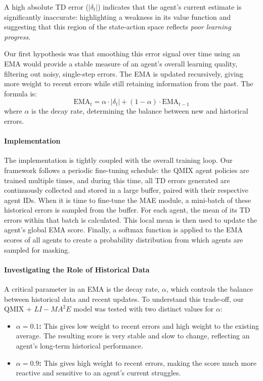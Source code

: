 A high absolute TD error ($|\delta_t|$) indicates that the agent's current estimate is significantly inaccurate: highlighting a weakness in its value function and suggesting that this region of the state-action space reflects \textit{poor learning progress}.



Our first hypothesis was that smoothing this error signal over time using an \ac{EMA} would provide a stable measure of an agent's overall learning quality, filtering out noisy, single-step errors. The \ac{EMA} is updated recursively, giving more weight to recent errors while still retaining information from the past. The formula is:
\begin{equation}
    \text{EMA}_t = \alpha \cdot |\delta_t| + (1 - \alpha) \cdot \text{EMA}_{t-1}
    \label{eq:ema}
\end{equation}
where $\alpha$ is the decay rate, determining the balance between new and historical errors.

\paragraph{Implementation}
The implementation is tightly coupled with the overall training loop. Our framework follows a periodic fine-tuning schedule: the QMIX agent policies are trained multiple times, and during this time, all TD errors generated are continuously collected and stored in a large buffer, paired with their respective agent IDs. When it is time to fine-tune the MAE module, a mini-batch of these historical errors is sampled from the buffer. For each agent, the mean of its TD errors within that batch is calculated. This local mean is then used to update the agent's global EMA score. Finally, a softmax function is applied to the EMA scores of all agents to create a probability distribution from which agents are sampled for masking.

\paragraph{Investigating the Role of Historical Data}
A critical parameter in an \ac{EMA} is the decay rate, $\alpha$, which controls the balance between historical data and recent updates. To understand this trade-off, our QMIX + $LI-{MA}^2E$ model was tested with two distinct values for $\alpha$:
\begin{itemize}
\item \textbf{$\alpha=0.1$:} This gives low weight to recent errors and high weight to the existing average. The resulting score is very stable and slow to change, reflecting an agent's long-term historical performance.
\item \textbf{$\alpha=0.9$:} This gives high weight to recent errors, making the score much more reactive and sensitive to an agent's current struggles.
\end{itemize}

